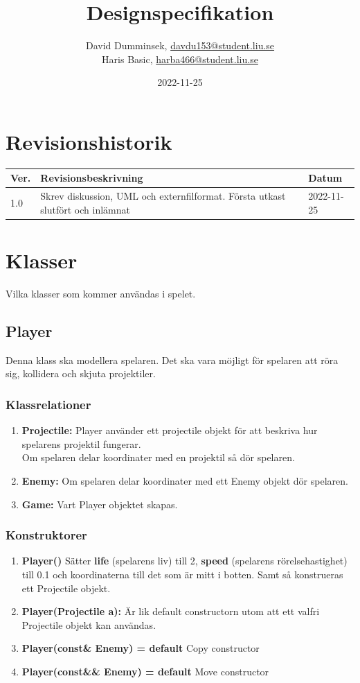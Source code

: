 \documentclass{TDP005mall}
\author{David Dumminsek, \url{davdu153@student.liu.se}\\
  Haris Basic, \url{harba466@student.liu.se}\\}
\title{Designspecifikation}
\date{2022-11-25}
\begin{document}
\projectpage
\section{Revisionshistorik}
\begin{table}[!h]
\begin{tabularx}{\linewidth}{|l|X|l|}
\hline
Ver. & Revisionsbeskrivning & Datum \\\hline
  1.0 & Skrev diskussion, UML och externfilformat. Första utkast slutfört och inlämnat & 2022-11-25\\\hline
\end{tabularx}
\end{table}


\section{Klasser}
Vilka klasser som kommer användas i spelet.

\subsection{Player}
Denna klass ska modellera spelaren.
Det ska vara möjligt för spelaren att röra sig, kollidera och skjuta projektiler.
\subsubsection*{Klassrelationer}
\begin{enumerate}
  \item \textbf{Projectile:} Player använder ett projectile objekt för att beskriva hur spelarens projektil fungerar.\\
                    Om spelaren delar koordinater med en projektil så dör spelaren.
  \item \textbf{Enemy:} Om spelaren delar koordinater med ett Enemy objekt dör spelaren.
  \item \textbf{Game:} Vart Player objektet skapas.
\end{enumerate}
\subsubsection*{Konstruktorer}
\begin{enumerate}
  \item \textbf{Player()} Sätter \textbf{life} (spelarens liv) till 2, \textbf{speed} (spelarens rörelsehastighet) till 0.1 och koordinaterna till det som är mitt i botten. Samt så konstrueras ett Projectile objekt.
  \item \textbf{Player(Projectile a):} Är lik default constructorn utom att ett valfri Projectile objekt kan användas.
    \item \textbf{Player(const\& Enemy) = default} Copy constructor
  \item \textbf{Player(const\&\& Enemy) = default} Move constructor
\end{enumerate}
\end{document}
